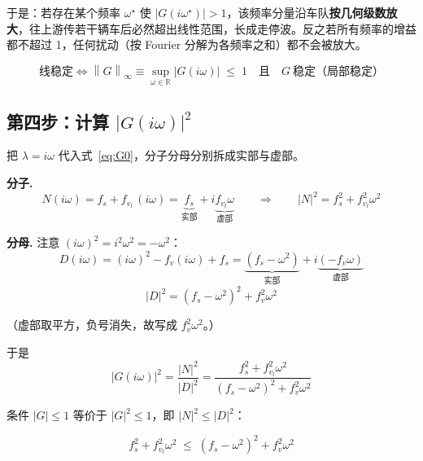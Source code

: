 \documentclass[11pt,a4paper,openany]{book}
\numberwithin{equation}{chapter}
\numberwithin{figure}{chapter}
\numberwithin{table}{chapter}
\begin{document}
于是：若存在某个频率 $\omega^\star$ 使 $\left|G(i\omega^\star)\right|>1$，该频率分量沿车队\textbf{按几何级数放大}，往上游传若干辆车后必然超出线性范围，长成走停波。反之若所有频率的增益都不超过 1，任何扰动（按 Fourier 分解为各频率之和）都不会被放大。

\begin{tcolorbox}[keybox,title=\textbf{线稳定性的严格定义}]
\[
\text{线稳定}
\iff
\left\|G\right\|_{\infty} \equiv \sup_{\omega\in\mathbb{R}}\left|G(i\omega)\right| \;\le\; 1
\quad\text{且}\quad G\ \text{稳定（局部稳定）}
\]
\end{tcolorbox}

\subsection{第四步：计算 $\left|G(i\omega)\right|^2$}

把 $\lambda = i\omega$ 代入式~\eqref{eq:G0}，分子分母分别拆成实部与虚部。

\textbf{分子.}
\begin{equation}
N(i\omega) = f_s + f_{v_l}\,(i\omega) = \underbrace{f_s}_{\text{实部}} + i\underbrace{f_{v_l}\omega}_{\text{虚部}}
\qquad\Longrightarrow\qquad
\left|N\right|^2 = f_s^2 + f_{v_l}^2\omega^2
\end{equation}

\textbf{分母.} 注意 $(i\omega)^2 = i^2\omega^2 = -\omega^2$：
\begin{equation}
D(i\omega) = (i\omega)^2 - f_v(i\omega) + f_s
= \underbrace{\left(f_s-\omega^2\right)}_{\text{实部}} + i\underbrace{\left(-f_v\omega\right)}_{\text{虚部}}
\end{equation}
\begin{equation}
\left|D\right|^2 = \left(f_s-\omega^2\right)^2 + f_v^2\omega^2
\end{equation}

（虚部取平方，负号消失，故写成 $f_v^2\omega^2$。）

于是
\begin{equation}
\left|G(i\omega)\right|^2 = \frac{\left|N\right|^2}{\left|D\right|^2}
= \frac{f_s^2 + f_{v_l}^2\omega^2}{\left(f_s-\omega^2\right)^2 + f_v^2\omega^2}
\end{equation}

条件 $\left|G\right|\le1$ 等价于 $\left|G\right|^2\le1$，即 $\left|N\right|^2\le\left|D\right|^2$：
\begin{tcolorbox}[keybox,title=\textbf{幅值条件}]
\begin{equation}
f_s^2 + f_{v_l}^2\omega^2
\;\le\;
\left(f_s-\omega^2\right)^2 + f_v^2\omega^2
\end{equation}
\end{tcolorbox}
\end{document}
